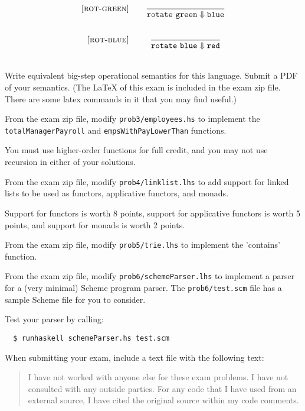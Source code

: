 \documentclass[addpoints]{exam}
\begin{document}
\begin{questions}
\[\begin{array}{r@{\qquad}c}
    \ssrule{rot-green}{
    }{
      \bstep{\rot \gval}{\bval}
    }

    \ssrule{rot-blue}{
    }{
      \bstep{\rot \bval}{\rval}
    }
  \end{array}
\]

Write equivalent big-step operational semantics for this language.
Submit a PDF of your semantics.
(The LaTeX of this exam is included in the exam zip file.
There are some latex commands in it that you may find useful.)


\eject

\question[15]

From the exam zip file, modify {\tt prob3/employees.hs} to implement
the {\tt totalManagerPayroll} and {\tt empsWithPayLowerThan} functions.

You must use higher-order functions for full credit,
and you may not use recursion in either of your solutions.

\vskip 1in

\question[15]

From the exam zip file, modify {\tt prob4/linklist.lhs} to add support
for linked lists to be used as functors, applicative functors, and monads.

Support for functors is worth 8 points, support for applicative functors
is worth 5 points, and support for monads is worth 2 points.

\vskip 1in

\question[15]

From the exam zip file, modify {\tt prob5/trie.lhs} to implement
the 'contains' function.
\vskip 1in


\question[15]

\vskip 1in

From the exam zip file, modify {\tt prob6/schemeParser.lhs} to implement
a parser for a (very minimal) Scheme program parser.  The
{\tt prob6/test.scm} file has a sample Scheme file for you to consider.

Test your parser by calling:
\begin{verbatim}
  $ runhaskell schemeParser.hs test.scm
\end{verbatim}

\vskip 1in

\question[10]
When submitting your exam, include a text file with the following text:

\begin{quote}
  I have not worked with anyone else for these exam problems.
  I have not consulted with any outside parties.  For any code
  that I have used from an external source, I have cited the
  original source within my code comments.
\end{quote}



\end{questions}
\end{document}
